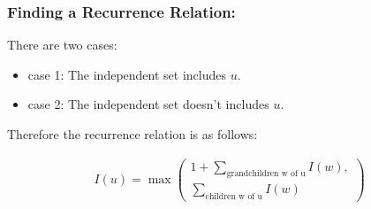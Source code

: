 \documentclass[12pt]{article}
\begin{document}
\subsubsection{Finding a Recurrence Relation:}
There are two cases:
\begin{itemize}
    \item case 1: The independent set includes $u$.
    \item case 2: The independent set doesn't includes $u$.
\end{itemize}
Therefore the recurrence relation is as follows:

\begin{align*}
    I(u) = \max\left(\begin{array}{c}
                         1 + \sum\limits_{\text{grandchildren w of u}} I(w), \\
                         \sum\limits_{\text{children w of u}} I(w)
                     \end{array}\right)
\end{align*}
\end{document}
